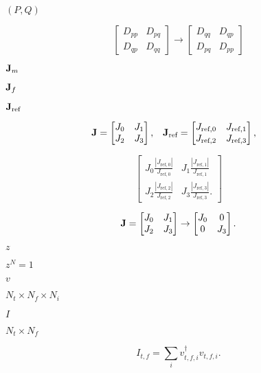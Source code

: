 \documentclass{article}
\begin{document}
$(P,Q)$
\pagebreak

\[ \begin{bmatrix} D_{pp} & D_{pq} \\ D_{qp} & D_{qq} \end{bmatrix} \rightarrow \begin{bmatrix} D_{qq} & D_{qp} \\ D_{pq} & D_{pp} \end{bmatrix} \]
\pagebreak

${\bf J}_m$
\pagebreak

${\bf J}_f$
\pagebreak

${\bf J}_\text{ref}$
\pagebreak

\[ \begin{aligned} {\bf J} &= \begin{bmatrix} J_0 & J_1 \\ J_2 & J_3 \end{bmatrix}, & {\bf J}_\text{ref} &= \begin{bmatrix} J_{\text{ref},0} & J_{\text{ref},1} \\ J_{\text{ref},2} & J_{\text{ref},3} \end{bmatrix}, \end{aligned} \]
\pagebreak

\[ \begin{bmatrix} J_0\frac{|J_{\text{ref},0}|}{J_{\text{ref},0}} & J_1\frac{|J_{\text{ref},1}|}{J_{\text{ref},1}} \\ J_2\frac{|J_{\text{ref},2}|}{J_{\text{ref},2}} & J_3\frac{|J_{\text{ref},3}|}{J_{\text{ref},3}}. \end{bmatrix} \]
\pagebreak

\[ {\bf J} = \begin{bmatrix} J_0 & J_1 \\ J_2 & J_3 \end{bmatrix} \rightarrow \begin{bmatrix} J_0 & 0 \\ 0 & J_3 \end{bmatrix}. \]
\pagebreak

$z$
\pagebreak

$z^N = 1$
\pagebreak

$v$
\pagebreak

$N_t \times N_f \times N_i$
\pagebreak

$I$
\pagebreak

$N_t \times N_f$
\pagebreak

\[ I_{t,f} = \sum_i v_{t,f,i}^\dagger v_{t,f,i}. \]
\pagebreak
\end{document}
